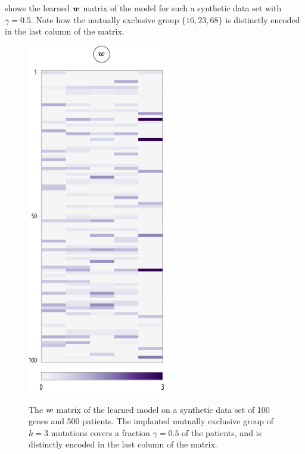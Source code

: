  shows the learned $\bm{w}$ matrix of the \fldc{} model for such a synthetic data set with $\gamma = 0.5$.
Note how the mutually exclusive group $\{16, 23, 68\}$ is distinctly encoded in the last column of the matrix.

\begin{figure}[htbp]
\centering
\includegraphics[width=0.55\textwidth]{figures/genes/mat_syn.pdf}\\[1em]
\caption{The $\bm{w}$ matrix of the learned \fldc{} model on a synthetic data set of 100 genes and 500 patients.
The implanted mutually exclusive group of $k = 3$ mutations covers a fraction $\gamma = 0.5$ of the patients, and is distinctly encoded in the last column of the matrix.}
\label{fig:syn_mat}
\end{figure}

\setlength{}
\setlength{}
\begin{figure}[htb]
  \centering
  
  \caption{
    \todo{}
  }
  \label{fig:syn_single}
\end{figure}

